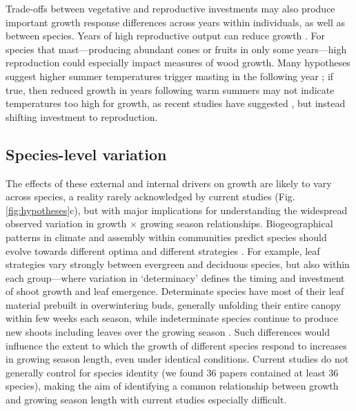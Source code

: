 \documentclass[11pt]{article}
\begin{document}
Trade-offs between vegetative and reproductive investments may also produce important growth response differences across years within individuals, as well as between species. Years of high reproductive output can reduce growth \citep{thomas2011bookchptr,hacket2016tree}. For species that mast---producing abundant cones or fruits in only some years---high reproduction could especially impact measures of wood growth. Many hypotheses suggest higher summer temperatures trigger masting in the following year \citep{hacket2016tree,hacket2016consistent}; if true, then reduced growth in years following warm summers may not indicate temperatures too high for growth, as recent studies have suggested \citep[e.g.,][]{gantois2022new,dow2022warm}, but instead shifting investment to reproduction.

\subsection*{Species-level variation}
The effects of these external and internal drivers on growth are likely to vary across species, a reality rarely acknowledged by current studies (Fig. \ref{fig:hypotheses}c), but with major implications for understanding the widespread observed variation in growth $\times$ growing season relationships. Biogeographical patterns in climate and assembly within communities predict species should evolve towards different optima and different strategies \citep{Ackerly:2009ly,buckley2012functional}. For example, leaf strategies vary strongly between evergreen and deciduous species, but also within each group---where variation in `determinacy' defines the timing and investment of shoot growth and leaf emergence. Determinate species have most of their leaf material prebuilt in overwintering buds, generally unfolding their entire canopy within few weeks each season, while indeterminate species continue to produce new shoots including leaves over the growing season \citep{kikuzawa1982leaf,Lechowicz:1984cr}. Such differences would influence the extent to which the growth of different species respond to increases in growing season length, even under identical conditions. Current studies do not generally control for species identity (we found 36 papers contained at least 36 species), making the aim of identifying a common relationship between growth and growing season length with current studies especially difficult.
\end{document}
